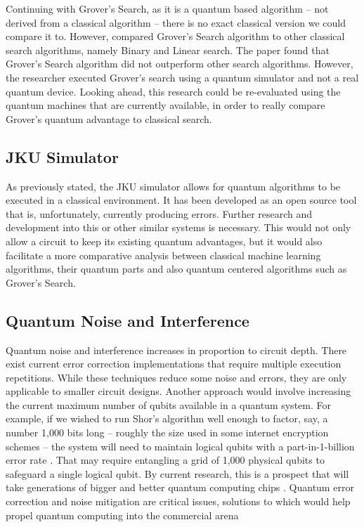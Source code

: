 Continuing with Grover's Search, as it is a quantum based algorithm -- not derived from a classical algorithm -- there is no exact classical version we could compare it to. However, \citep{GroverCompared} compared Grover's Search algorithm to other classical search algorithms, namely Binary and Linear search. The paper found that Grover's Search algorithm did not outperform other search algorithms. However, the researcher executed Grover's search using a quantum simulator and not a real quantum device. Looking ahead, this research could be re-evaluated  using the quantum machines that are currently available, in order to really compare Grover's quantum advantage to classical search.

\subsection{JKU Simulator}
As previously stated, the JKU simulator allows for quantum algorithms to be executed in a classical environment. It has been developed as an open source tool that is, unfortunately, currently producing errors. Further research and development into this or other similar systems is necessary. This would not only allow a circuit to keep its existing quantum advantages, but it would also facilitate a more comparative analysis between classical machine learning algorithms, their quantum parts and also quantum centered algorithms such as Grover’s Search. 

\subsection{Quantum Noise and Interference}

Quantum noise and interference increases in proportion to circuit depth. There exist current error correction implementations that require multiple execution repetitions. While these techniques reduce some noise and errors, they are only applicable to smaller circuit designs. Another approach would involve increasing the current maximum number of qubits available in a quantum system. For example, if we wished to run Shor’s algorithm \citep{shor_lowB} well enough to factor, say, a number 1,000 bits long -- roughly the size used in some internet encryption schemes -- the system will need to maintain logical qubits with a part-in-1-billion error rate \citep{cho_2020}. That may require entangling a grid of 1,000 physical qubits to safeguard a single logical qubit. By current research, this is a prospect that will take generations of bigger and better quantum computing chips \citep{ADCho}. Quantum error correction and noise mitigation are critical issues, solutions to which would help propel quantum computing into the commercial arena \citep{Amaz}%

